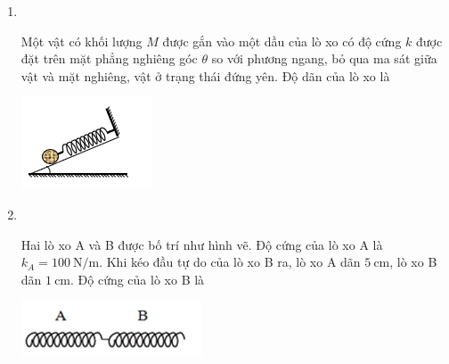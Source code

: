 \begin{enumerate}[label=\bfseries Câu \arabic*:, leftmargin=1.5cm]
\item {}\\
{ Một vật có khối lượng $M$ được gắn vào một dầu của lò xo có độ cứng $k$ được đặt trên mặt phẳng nghiêng góc $\theta$ so với phương ngang, bỏ qua ma sát giữa vật và mặt nghiêng, vật ở trạng thái đứng yên. Độ dãn của lò xo là
\begin{center}
	\includegraphics[width=0.2\linewidth]{../figs/VN10-2023-PH-TP0009-1}
\end{center}
}

\item {}\\
{Hai lò xo A và B được bố trí như hình vẽ. Độ cứng của lò xo A là $k_A=\SI{100}{\newton/\meter}$. Khi kéo đầu tự do của lò xo B ra, lò xo A dãn $\SI{5}{\centi\meter}$, lò xo B dãn $\SI{1}{\centi\meter}$. Độ cứng của lò xo B là
	\begin{center}
		\includegraphics[width=0.3\linewidth]{../figs/VN10-2023-PH-TP0009-2}
	\end{center}
	\begin{mcq}(4)
		\item $\SI{100}{\newton\meter}$.
		\item $\SI{25}{\newton/\meter}$.
		\item $\SI{350}{\newton/\meter}$.
		\item $\SI{500}{\newton/\meter}$.
	\end{mcq}

}
\end{enumerate}
